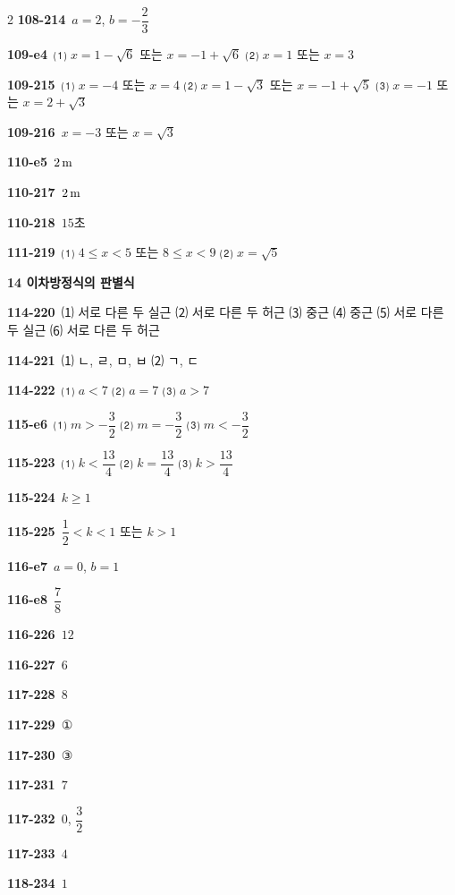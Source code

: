 \documentclass[10pt,a4paper]{article}
\begin{document}
\begin{multicols}{2}
\noindent\textbf{108-214}\ $a=2$, $b=-\dfrac{2}{3}$\par
\noindent\textbf{109-e4}\ ⑴ $x=1-\sqrt{6}$ 또는 $x=-1+\sqrt{6}$ ⑵ $x=1$ 또는 $x=3$\par
\noindent\textbf{109-215}\ ⑴ $x=-4$ 또는 $x=4$ ⑵ $x=1-\sqrt{3}$ 또는 $x=-1+\sqrt{5}$ ⑶ $x=-1$ 또는 $x=2+\sqrt{3}$\par
\noindent\textbf{109-216}\ $x=-3$ 또는 $x=\sqrt{3}$\par
\noindent\textbf{110-e5}\ $2\mkern3mu \mathrm{m}$\par
\noindent\textbf{110-217}\ $2\mkern3mu \mathrm{m}$\par
\noindent\textbf{110-218}\ $15$초\par
\noindent\textbf{111-219}\ ⑴ $4\le x<5$ 또는 $8\le x<9$ ⑵ $x=\sqrt{5}$\par
\noindent\textbf{14 이차방정식의 판별식}\par\smallskip
\noindent\textbf{114-220}\ ⑴ 서로 다른 두 실근 ⑵ 서로 다른 두 허근 ⑶ 중근 ⑷ 중근 ⑸ 서로 다른 두 실근 ⑹ 서로 다른 두 허근\par
\noindent\textbf{114-221}\ ⑴ ㄴ, ㄹ, ㅁ, ㅂ ⑵ ㄱ, ㄷ\par
\noindent\textbf{114-222}\ ⑴ $a<7$ ⑵ $a=7$ ⑶ $a>7$\par
\noindent\textbf{115-e6}\ ⑴ $m>-\dfrac{3}{2}$ ⑵ $m=-\dfrac{3}{2}$ ⑶ $m<-\dfrac{3}{2}$\par
\noindent\textbf{115-223}\ ⑴ $k<\dfrac{13}{4}$ ⑵ $k=\dfrac{13}{4}$ ⑶ $k>\dfrac{13}{4}$\par
\noindent\textbf{115-224}\ $k\ge 1$\par
\noindent\textbf{115-225}\ $\dfrac{1}{2}<k<1$ 또는 $k>1$\par
\noindent\textbf{116-e7}\ $a=0$, $b=1$\par
\noindent\textbf{116-e8}\ $\dfrac{7}{8}$\par
\noindent\textbf{116-226}\ $12$\par
\noindent\textbf{116-227}\ $6$\par
\noindent\textbf{117-228}\ $8$\par
\noindent\textbf{117-229}\ ①\par
\noindent\textbf{117-230}\ ③\par
\noindent\textbf{117-231}\ $7$\par
\noindent\textbf{117-232}\ $0$, $\dfrac{3}{2}$\par
\noindent\textbf{117-233}\ $4$\par
\noindent\textbf{118-234}\ $1$\par

\end{multicols}
\end{document}
